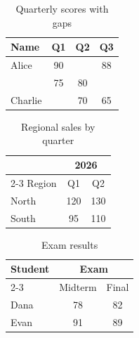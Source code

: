 \documentclass{article}
\begin{document}
\begin{table}[h]
  \centering
  \begin{tabular}{|l|c|c|c|}
    \hline
    Name & Q1 & Q2 & Q3 \\
    \hline
    Alice & 90 & & 88 \\
     & 75 & 80 & \\
    Charlie & & 70 & 65 \\
    \hline
  \end{tabular}
  \caption{Quarterly scores with gaps}
\end{table}


\begin{table}[h]
  \centering
  \begin{tabular}{|l|c|c|}
    \hline
    \multicolumn{1}{|c|}{} & \multicolumn{2}{c|}{2026} \\
    \cline{2-3}
    Region & Q1 & Q2 \\
    \hline
    North & 120 & 130 \\
    South & 95 & 110 \\
    \hline
  \end{tabular}
  \caption{Regional sales by quarter}
\end{table}


\begin{table}[h]
  \centering
  \begin{tabular}{|l|c|c|}
    \hline
    \multirow{2}{*}{Student} & \multicolumn{2}{c|}{Exam} \\
    \cline{2-3}
     & Midterm & Final \\
    \hline
    Dana & 78 & 82 \\
    Evan & 91 & 89 \\
    \hline
  \end{tabular}
  \caption{Exam results}
\end{table}
\end{document}
